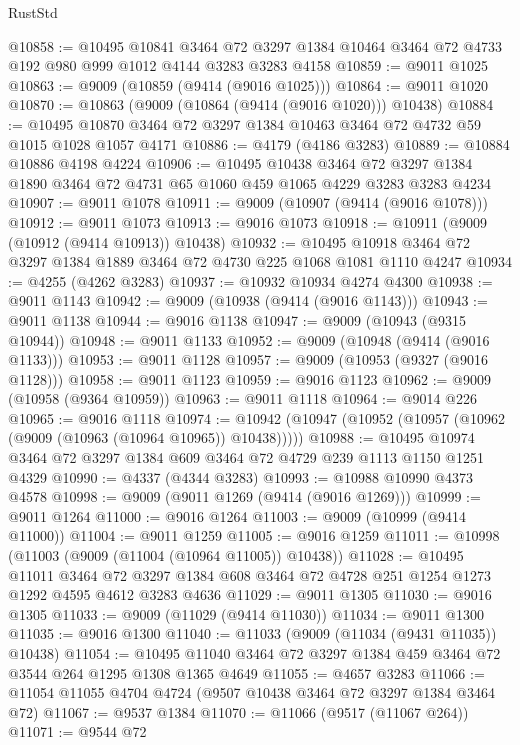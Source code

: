 \begin{lexlean}{RustStd}
\begin{coremodule}
@10858 := @10495
    @10841
    @3464
    @72
    @3297
    @1384
    @10464
    @3464
    @72
    @4733
    @192
    @980
    @999
    @1012
    @4144
    @3283
    @3283
    @4158
@10859 := @9011 @1025
@10863 := @9009 (@10859 (@9414 (@9016 @1025)))
@10864 := @9011 @1020
@10870 := @10863 (@9009 (@10864 (@9414 (@9016 @1020))) @10438)
@10884 := @10495 @10870 @3464 @72 @3297 @1384 @10463 @3464 @72 @4732 @59 @1015 @1028 @1057 @4171
@10886 := @4179 (@4186 @3283)
@10889 := @10884 @10886 @4198 @4224
@10906 := @10495
    @10438
    @3464
    @72
    @3297
    @1384
    @1890
    @3464
    @72
    @4731
    @65
    @1060
    @459
    @1065
    @4229
    @3283
    @3283
    @4234
@10907 := @9011 @1078
@10911 := @9009 (@10907 (@9414 (@9016 @1078)))
@10912 := @9011 @1073
@10913 := @9016 @1073
@10918 := @10911 (@9009 (@10912 (@9414 @10913)) @10438)
@10932 := @10495 @10918 @3464 @72 @3297 @1384 @1889 @3464 @72 @4730 @225 @1068 @1081 @1110 @4247
@10934 := @4255 (@4262 @3283)
@10937 := @10932 @10934 @4274 @4300
@10938 := @9011 @1143
@10942 := @9009 (@10938 (@9414 (@9016 @1143)))
@10943 := @9011 @1138
@10944 := @9016 @1138
@10947 := @9009 (@10943 (@9315 @10944))
@10948 := @9011 @1133
@10952 := @9009 (@10948 (@9414 (@9016 @1133)))
@10953 := @9011 @1128
@10957 := @9009 (@10953 (@9327 (@9016 @1128)))
@10958 := @9011 @1123
@10959 := @9016 @1123
@10962 := @9009 (@10958 (@9364 @10959))
@10963 := @9011 @1118
@10964 := @9014 @226
@10965 := @9016 @1118
@10974 := @10942 (@10947 (@10952 (@10957 (@10962 (@9009 (@10963 (@10964 @10965)) @10438)))))
@10988 := @10495 @10974 @3464 @72 @3297 @1384 @609 @3464 @72 @4729 @239 @1113 @1150 @1251 @4329
@10990 := @4337 (@4344 @3283)
@10993 := @10988 @10990 @4373 @4578
@10998 := @9009 (@9011 @1269 (@9414 (@9016 @1269)))
@10999 := @9011 @1264
@11000 := @9016 @1264
@11003 := @9009 (@10999 (@9414 @11000))
@11004 := @9011 @1259
@11005 := @9016 @1259
@11011 := @10998 (@11003 (@9009 (@11004 (@10964 @11005)) @10438))
@11028 := @10495
    @11011
    @3464
    @72
    @3297
    @1384
    @608
    @3464
    @72
    @4728
    @251
    @1254
    @1273
    @1292
    @4595
    @4612
    @3283
    @4636
@11029 := @9011 @1305
@11030 := @9016 @1305
@11033 := @9009 (@11029 (@9414 @11030))
@11034 := @9011 @1300
@11035 := @9016 @1300
@11040 := @11033 (@9009 (@11034 (@9431 @11035)) @10438)
@11054 := @10495 @11040 @3464 @72 @3297 @1384 @459 @3464 @72 @3544 @264 @1295 @1308 @1365 @4649
@11055 := @4657 @3283
@11066 := @11054 @11055 @4704 @4724 (@9507 @10438 @3464 @72 @3297 @1384 @3464 @72)
@11067 := @9537 @1384
@11070 := @11066 (@9517 (@11067 @264))
@11071 := @9544 @72

\end{coremodule}
\end{lexlean}
